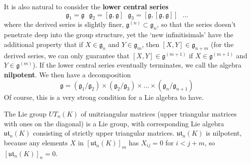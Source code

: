 It is also natural to consider the {\bf lower central series}
%
\[ \mathfrak{g}_1 = \mathfrak{g}\ \ \  \mathfrak{g}_2 = [\mathfrak{g}, \mathfrak{g}]\ \ \ \mathfrak{g}_3 = [\mathfrak{g}, [\mathfrak{g}, \mathfrak{g}]]\ \ \  \dots \]
%
where the derived series is slightly finer, $\mathfrak{g}^{(n)} \subset \mathfrak{g}_n$, so that the series doesn't penetrate deep into the group structure, yet the `new infinitisimals' have the additional property that if $X \in \mathfrak{g}_n$ and $Y \in \mathfrak{g}_m$, then $[X,Y] \in \mathfrak{g}_{n+m}$ (for the derived series, we can only guarantee that $[X,Y] \in \mathfrak{g}^{(m+1)}$ if $X \in \mathfrak{g}^{(m+1)}$ and $Y \in \mathfrak{g}^{(m)}$). If the lower central series eventually terminates, we call the algebra {\bf nilpotent}. We then have a decomposition
%
\[ \mathfrak{g} = (\mathfrak{g}_1/\mathfrak{g}_2) \times (\mathfrak{g}_2/\mathfrak{g}_3) \times \dots \times (\mathfrak{g}_n/\mathfrak{g}_{n+1}) \]
%
Of course, this is a very strong condition for a Lie algebra to have.

\begin{example}
    The Lie group $UT_n(K)$ of unitriangular matrices (upper triangular matrices with ones on the diagonal) is a Lie group, with corresponding Lie algebra $\mathfrak{ut}_n(K)$ consisting of strictly upper triangular matrices. $\mathfrak{ut}_n(K)$ is nilpotent, because any elements $X$ in $[\mathfrak{ut}_n(K)]_m$ has $X_{ij} = 0$ for $i < j + m$, so $[\mathfrak{ut}_n(K)]_n = 0$.
\end{example}

